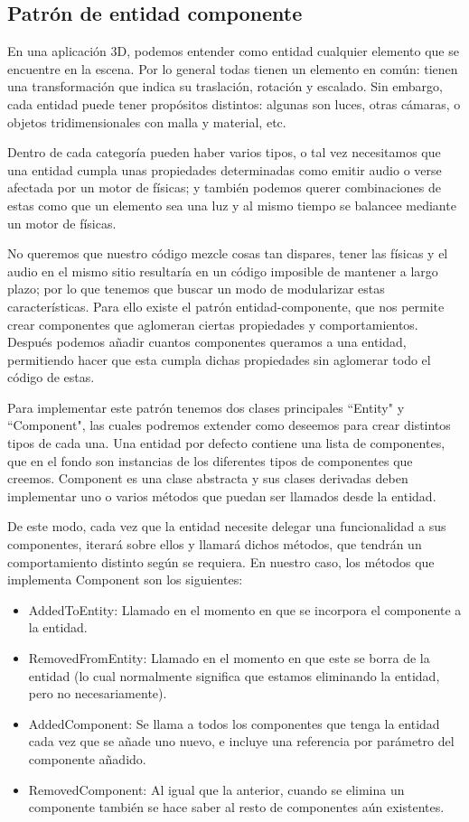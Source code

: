 \subsection{Patrón de entidad componente}
\label{entity_component}
En una aplicación 3D, podemos entender como entidad cualquier elemento que se encuentre en la escena. Por lo general todas tienen un elemento en común: tienen una transformación que indica su traslación, rotación y escalado. Sin embargo, cada entidad puede tener propósitos distintos: algunas son luces, otras cámaras, o objetos tridimensionales con malla y material, etc.

Dentro de cada categoría pueden haber varios tipos, o tal vez necesitamos que una entidad cumpla unas propiedades determinadas como emitir audio o verse afectada por un motor de físicas; y también podemos querer combinaciones de estas como que un elemento sea una luz y al mismo tiempo se balancee mediante un motor de físicas.

No queremos que nuestro código mezcle cosas tan dispares, tener las físicas y el audio en el mismo sitio resultaría en un código imposible de mantener a largo plazo; por lo que tenemos que buscar un modo de modularizar estas características. Para ello existe el patrón entidad-componente, que nos permite crear componentes que aglomeran ciertas propiedades y comportamientos. Después podemos añadir cuantos componentes queramos a una entidad, permitiendo hacer que esta cumpla dichas propiedades sin aglomerar todo el código de estas.

Para implementar este patrón tenemos dos clases principales ``Entity" y ``Component", las cuales podremos extender como deseemos para crear distintos tipos de cada una. Una entidad por defecto contiene una lista de componentes, que en el fondo son instancias de los diferentes tipos de componentes que creemos. Component es una clase abstracta y sus clases derivadas deben implementar uno o varios métodos que puedan ser llamados desde la entidad.

De este modo, cada vez que la entidad necesite delegar una funcionalidad a sus componentes, iterará sobre ellos y llamará dichos métodos, que tendrán un comportamiento distinto según se requiera. En nuestro caso, los métodos que implementa Component son los siguientes:

\begin{itemize}
    \item AddedToEntity: Llamado en el momento en que se incorpora el componente a la entidad.
    \item RemovedFromEntity: Llamado en el momento en que este se borra de la entidad (lo cual normalmente significa que estamos eliminando la entidad, pero no necesariamente).
    \item AddedComponent: Se llama a todos los componentes que tenga la entidad cada vez que se añade uno nuevo, e incluye una referencia por parámetro del componente añadido.
    \item RemovedComponent: Al igual que la anterior, cuando se elimina un componente también se hace saber al resto de componentes aún existentes.
\end{itemize}

